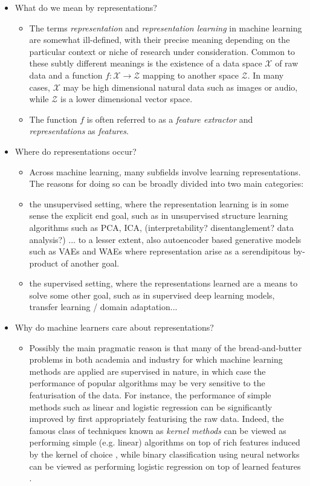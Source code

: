 \begin{itemize}
\item What do we mean by representations?
\begin{itemize}
	\item The terms \emph{representation} and \emph{representation learning} in machine learning are somewhat ill-defined, with their precise meaning depending on the particular context or niche of research under consideration. Common to these subtly different meanings is the existence of a data space $\mathcal{X}$ of raw data and a function $f:\mathcal{X} \to \mathcal{Z}$ mapping to another space $\mathcal{Z}$. In many cases, $\mathcal{X}$ may be high dimensional natural data such as images or audio, while $\mathcal{Z}$ is a lower dimensional vector space.
	\item The function $f$ is often referred to as a \emph{feature extractor} and \emph{representations} as \emph{features}.
\end{itemize}
\item Where do representations occur?
\begin{itemize}
	\item Across machine learning, many subfields involve learning representations. The reasons for doing so can be broadly divided into two main categories: 
	\item the unsupervised setting, where the representation learning is in some sense the explicit end goal, such as in unsupervised structure learning algorithms such as PCA, ICA, (interpretability? disentanglement? data analysis?) ... to a lesser extent, also autoencoder based generative models such as VAEs and WAEs where representation arise as a serendipitous by-product of another goal.
	\item the supervised setting, where the representations learned are a means to solve some other goal, such as in supervised deep learning models, transfer learning / domain adaptation...
\end{itemize}
\item Why do machine learners care about representations?
\begin{itemize}
	\item Possibly the main pragmatic reason is that many of the bread-and-butter problems in both academia and industry for which machine learning methods are applied are supervised in nature, in which case the performance of popular algorithms may be very sensitive to the featurisation of the data. For instance, the performance of simple methods such as linear and logistic regression can be significantly improved by first appropriately featurising the raw data. Indeed, the famous class of techniques known as \emph{kernel methods} can be viewed as performing simple (e.g. linear) algorithms on top of rich features induced by the kernel of choice \citep{scholkopf2001learning, rasmussen2006gaussian}, while binary classification using neural networks can be viewed as performing logistic regression on top of learned features \citep{goodfellow2016deep}.

\end{itemize}
\end{itemize}
